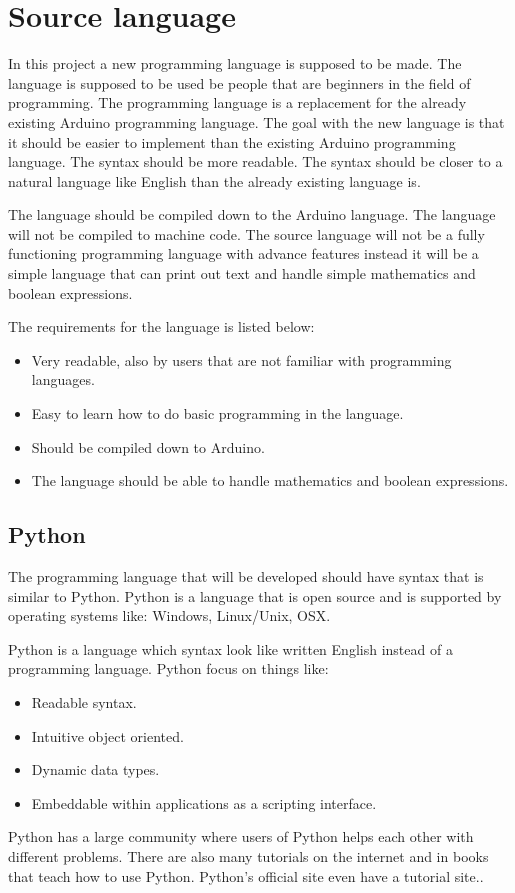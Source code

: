 \section{Source language}
In this project a new programming language is supposed to be made. The language is supposed to be used be people that are beginners in the field of programming. The programming language is a replacement for the already existing Arduino programming language. 
The goal with the new language is that it should be easier to implement than the existing Arduino programming language. The syntax should be more readable. The syntax should be closer to a natural language like English than the already existing language is.

The language should be compiled down to the Arduino language. The language will not be compiled to machine code. The source language will not be a fully functioning programming language with advance features instead it will be a simple language that can print out text and handle simple mathematics and boolean expressions.

The requirements for the language is listed below:
\begin{itemize}
	\item Very readable, also by users that are not familiar with programming languages.
	\item Easy to learn how to do basic programming in the language.
	\item Should be compiled down to Arduino.
	\item The language should be able to handle mathematics and boolean expressions.
\end{itemize}

\subsection{Python}
The programming language that will be developed should have syntax that is similar to Python. Python is a language that is open source and is supported by operating systems like: Windows, Linux/Unix, OSX.

Python is a language which syntax look like written English instead of a programming language.
Python focus on things like:

\begin{itemize}
	\item Readable syntax.
	\item Intuitive object oriented.
	\item Dynamic data types.
	\item Embeddable within applications as a scripting interface.
\end{itemize} 
\cite{python:official:about}
Python has a large community where users of Python helps each other with different problems. There are also many tutorials on the internet and in books that teach how to use Python. Python's official site even have a tutorial site.\cite{python:official:tutorial}.